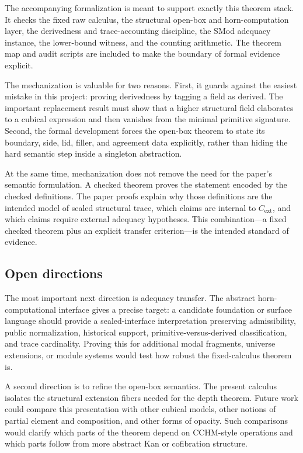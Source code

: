 The accompanying formalization is meant to support exactly this theorem stack.  It checks the
fixed raw calculus, the structural open-box and horn-computation layer, the derivedness and
trace-accounting discipline, the SMod adequacy instance, the lower-bound witness, and the
counting arithmetic.  The theorem map and audit scripts are included to make the boundary of
formal evidence explicit.

The mechanization is valuable for two reasons.  First, it guards against the easiest mistake in
this project: proving derivedness by tagging a field as derived.  The important replacement
result must show that a higher structural field elaborates to a cubical expression and then
vanishes from the minimal primitive signature.  Second, the formal development forces the
open-box theorem to state its boundary, side, lid, filler, and agreement data explicitly,
rather than hiding the hard semantic step inside a singleton abstraction.

At the same time, mechanization does not remove the need for the paper's semantic
formulation.  A checked theorem proves the statement encoded by the checked definitions.  The
paper proofs explain why those definitions are the intended model of sealed structural trace,
which claims are internal to \(C_{\mathrm{ext}}\), and which claims require external adequacy
hypotheses.  This combination---a fixed checked theorem plus an explicit transfer
criterion---is the intended standard of evidence.

\subsection{Open directions}
\label{subsec:conclusion-open-directions}

The most important next direction is adequacy transfer.  The abstract horn-computational
interface gives a precise target: a candidate foundation or surface language should provide a
sealed-interface interpretation preserving admissibility, public normalization, historical
support, primitive-versus-derived classification, and trace cardinality.  Proving this for
additional modal fragments, universe extensions, or module systems would test how robust the
fixed-calculus theorem is.

A second direction is to refine the open-box semantics.  The present calculus isolates the
structural extension fibers needed for the depth theorem.  Future work could compare this
presentation with other cubical models, other notions of partial element and composition, and
other forms of opacity.  Such comparisons would clarify which parts of the theorem depend on
CCHM-style operations and which parts follow from more abstract Kan or cofibration structure.

